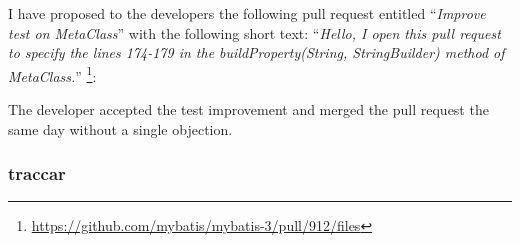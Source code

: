 I have proposed to the developers the following pull request entitled ``\emph{Improve test on MetaClass}'' with the following short text: ``\emph{Hello, I open this pull request to specify the lines 174-179 in the buildProperty(String, StringBuilder) method of MetaClass.}'' \footnote{\url{https://github.com/mybatis/mybatis-3/pull/912/files}}:
\begin{figure}[H]
	\centering{}
\end{figure}

The developer accepted the test improvement and merged the pull request the same day without a single objection. 


\subsubsection{traccar}


